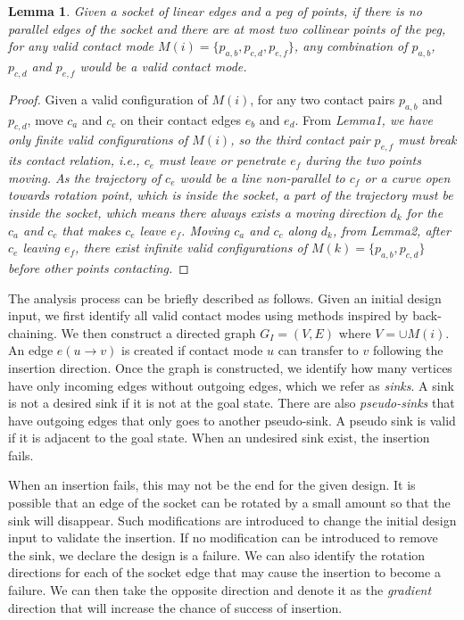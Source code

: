 \documentclass[letterpaper, 10 pt, conference]{ieeeconf}
\newtheorem{lemma}[theorem]{Lemma}
\begin{document}
\begin{lemma}
Given a socket of linear edges and a peg of points, if there is no parallel edges of the socket and there are at most two collinear points of the peg, for any valid contact mode $M(i) = \{p_{a,b}, p_{c,d}, p_{e,f}\}$, any combination of $p_{a,b}$, $p_{c,d}$ and $p_{e,f}$ would be a valid contact mode.
\end{lemma}

\begin{proof}
Given a valid configuration of $M(i)$, for any two contact pairs $p_{a,b}$ and $p_{c,d}$, move $c_a$ and $c_c$ on their contact edges $e_b$ and $e_d$. From \em{Lemma1}, we have only finite valid configurations of $M(i)$, so the third contact pair $p_{e,f}$ must break its contact relation, i.e., $c_e$ must leave or penetrate $e_f$ during the two points moving. 
As the trajectory of $c_e$ would be a line non-parallel to $c_f$ or a curve open towards rotation point, which is inside the socket, a part of the trajectory must be inside the socket, which means there always exists a moving direction $d_k$ for the $c_a$ and $c_c$ that makes $c_e$ leave $e_f$.  Moving $c_a$ and $c_c$ along $d_k$, from \em{Lemma2}, after $c_e$ leaving $e_f$, there exist infinite valid configurations of $M(k) = \{p_{a,b}, p_{c,d}\}$ before other  points contacting. 
\end{proof}

The analysis process can be briefly described as follows. Given an initial design input, we first identify all valid contact modes using methods inspired by back-chaining. We then construct a directed graph $G_I = (V, E)$ where $V = \cup M(i)$. An edge $e(u\rightarrow v)$ is created if contact mode $u$ can transfer to $v$ following the insertion direction. Once the graph is constructed, we identify how many vertices have only incoming edges without outgoing edges, which we refer as {\em sinks}. A sink is not a desired sink if it is not at the goal state. There are also {\em pseudo-sinks} that have outgoing edges that only goes to another pseudo-sink. A pseudo sink is valid if it is adjacent to the goal state. When an undesired sink exist, the insertion fails. 

When an insertion fails, this may not be the end for the given design. It is possible that an edge of the socket can be rotated by a small amount so that the sink will disappear. Such modifications are introduced to change the initial design input to validate the insertion. If no modification can be introduced to remove the sink, we declare the design is a failure. We can also identify the rotation directions for each of the socket edge that may cause the insertion to become a failure. We can then take the opposite direction and denote it as the {\em gradient} direction that will increase the chance of success of insertion. 
\end{document}
